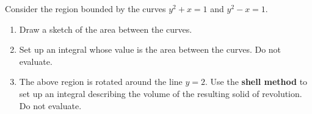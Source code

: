 \documentclass[12pt]{article}
\begin{document}
Consider the region bounded by the curves $y^2+x=1$ and $y^2-x=1$.
\begin{enumerate}
\item Draw a sketch of the area between the curves.
\vspace{2in}
\item Set up an integral whose value is the area between the curves.  Do not evaluate.
\vspace{2in}
\item 
The above region is rotated around the line $y=2$.
Use the \textbf{shell method} to set up an integral describing the volume of the resulting solid of revolution.
Do not evaluate.
\end{enumerate}
\end{document}
